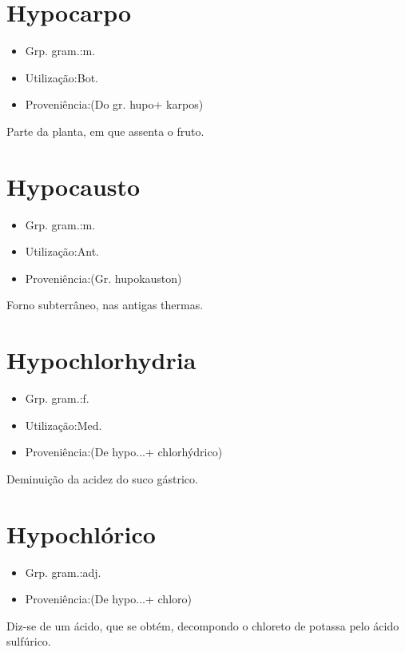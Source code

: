 \documentclass{article}
\begin{document}
\section{Hypocarpo}
\begin{itemize}
\item {Grp. gram.:m.}
\end{itemize}
\begin{itemize}
\item {Utilização:Bot.}
\end{itemize}
\begin{itemize}
\item {Proveniência:(Do gr. \textunderscore hupo\textunderscore  + \textunderscore karpos\textunderscore )}
\end{itemize}
Parte da planta, em que assenta o fruto.
\section{Hypocausto}
\begin{itemize}
\item {Grp. gram.:m.}
\end{itemize}
\begin{itemize}
\item {Utilização:Ant.}
\end{itemize}
\begin{itemize}
\item {Proveniência:(Gr. \textunderscore hupokauston\textunderscore )}
\end{itemize}
Forno subterrâneo, nas antigas thermas.
\section{Hypochlorhydria}
\begin{itemize}
\item {Grp. gram.:f.}
\end{itemize}
\begin{itemize}
\item {Utilização:Med.}
\end{itemize}
\begin{itemize}
\item {Proveniência:(De \textunderscore hypo...\textunderscore  + \textunderscore chlorhýdrico\textunderscore )}
\end{itemize}
Deminuição da acidez do suco gástrico.
\section{Hypochlórico}
\begin{itemize}
\item {Grp. gram.:adj.}
\end{itemize}
\begin{itemize}
\item {Proveniência:(De \textunderscore hypo...\textunderscore  + \textunderscore chloro\textunderscore )}
\end{itemize}
Diz-se de um ácido, que se obtém, decompondo o chloreto de potassa pelo ácido sulfúrico.
\end{document}
